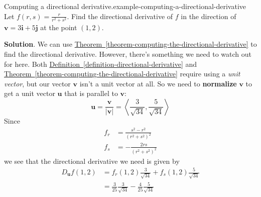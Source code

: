 \documentclass[10pt,]{book}
\newcommand{\terminology}[1]{\textbf{#1}}
\numberwithin{equation}{section}
\newcommand{\vv}[1]{\mathbf{#1}}
\newcommand{\dotprod}[1]{\left\langle #1 \right\rangle}
\begin{document}
\begin{example}{Computing a directional derivative.}{example-computing-a-directional-derivative}%
\hypertarget{p-1402}{}%
Let \(f(r,s) = \frac{r}{r^{2}+s^{2}}\). Find the directional derivative of \(f\) in the direction of \(\vv{v} = 3\vv{i} + 5\vv{j}\) at the point \((1,2)\).%
\par\smallskip%
\noindent\textbf{Solution}.\hypertarget{solution-227}{}\quad%
\hypertarget{p-1403}{}%
We can use \hyperref[theorem-computing-the-directional-derivative]{Theorem~\ref{theorem-computing-the-directional-derivative}} to find the directional derivative. However, there's something we need to watch out for here. Both \hyperref[definition-directional-derivative]{Definition~\ref{definition-directional-derivative}} and \hyperref[theorem-computing-the-directional-derivative]{Theorem~\ref{theorem-computing-the-directional-derivative}} require using a \emph{unit vector}, but our vector \(\vv{v}\) isn't a unit vector at all. So we need to \terminology{normalize} \(\vv{v}\) to get a unit vector \(\vv{u}\) that is parallel to \(\vv{v}\):%
\begin{equation*}
\vv{u} = \frac{\vv{v}}{|\vv{v}|} = \dotprod{\frac{3}{\sqrt{34}}, \frac{5}{\sqrt{34}}}
\end{equation*}
Since%
\begin{align*}
f_{r} & = \frac{s^{2} - r^{2}}{(r^{2} + s^{2})^{2}} \\
f_{s} & = -\frac{2rs}{(r^{2} + s^{2})^{2}} 
\end{align*}
we see that the directional derivative we need is given by%
\begin{align*}
D_{\vv{u}}f(1,2) & = f_{r}(1,2)\frac{3}{\sqrt{34}} + f_{s}(1,2)\frac{5}{\sqrt{34}} \\
& = \frac{3}{25}\frac{3}{\sqrt{34}} - \frac{4}{25}\frac{5}{\sqrt{34}} 
\end{align*}
%
\end{example}
%
%
\typeout{************************************************}
\typeout{************************************************}
%
\end{document}
